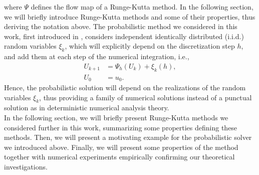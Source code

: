 where $\Psi$ defines the flow map of a Runge-Kutta method. In the following section, we will briefly introduce Runge-Kutta methods and some of their properties, thus deriving the notation above. The probabilistic method we considered in this work, first introduced in \cite{CGS16}, considers independent identically distributed (i.i.d.) random variables $\xi_k$, which will explicitly depend on the discretization step $h$, and add them at each step of the numerical integration, i.e., 
\begin{equation}\label{eq:probMethod}
\begin{aligned}
	U_{k+1} &= \Psi_h(U_k) + \xi_k(h), \\
	U_0 &= u_0.
\end{aligned}
\end{equation}
Hence, the probabilistic solution will depend on the realizations of the random variables $\xi_k$, thus providing a family of numerical solutions instead of a punctual solution as in deterministic numerical analysis theory. \\
In the following section, we will briefly present Runge-Kutta methods we considered further in this work, summarizing some properties defining these methods. Then, we will present a motivating example for the probabilistic solver we introduced above. Finally, we will present some properties of the method together with numerical experiments empirically confirming our theoretical investigations. 




